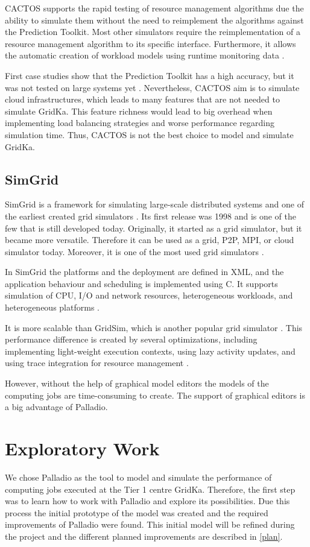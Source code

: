 CACTOS supports the rapid testing of resource management algorithms due the ability to simulate them without the need to reimplement the algorithms against the Prediction Toolkit. Most other simulators require the reimplementation of a resource management algorithm to its specific interface. Furthermore, it allows the automatic creation of workload models using runtime monitoring data \cite{rapidtesting}.

First case studies show that the Prediction Toolkit has a high accuracy, but it was not tested on large systems yet \cite{rapidtesting}. Nevertheless, CACTOS aim is to simulate cloud infrastructures, which leads to many features that are not needed to simulate GridKa. This feature richness would lead to big overhead when implementing load balancing strategies and worse performance regarding simulation time. Thus, CACTOS is not the best choice to model and simulate GridKa.


\section{SimGrid}
SimGrid is a framework for simulating large-scale distributed systems and one of the earliest created grid simulators \cite{simgrid_update}. Its first release was 1998 and is one of the few that is still developed today. Originally, it started as a grid simulator, but it became more versatile. Therefore it can be used as a grid, P2P, MPI, or cloud simulator today. Moreover, it is one of the most used grid simulators \cite{simgrid_update}.

In SimGrid the platforms and the deployment are defined in XML, and the application behaviour and scheduling is implemented using C. It supports simulation of CPU, I/O and network resources, heterogeneous workloads, and heterogeneous platforms \cite{simgrid_update}.

It is more scalable than GridSim, which is another popular grid simulator \cite{simgrid_update}.
This performance difference is created by several optimizations, including implementing light-weight execution contexts, using lazy activity updates, and using trace integration for resource management \cite{simgrid_update}.

However, without the help of graphical model editors the models of the computing jobs are time-consuming to create. The support of graphical editors is a big advantage of Palladio. 


\chapter{Exploratory Work}
We chose Palladio as the tool to model and simulate the performance of computing jobs executed at the Tier 1 centre GridKa. Therefore, the first step was to learn how to work with Palladio and explore its possibilities. Due this process the initial prototype of the model was created and the required improvements of Palladio were found. This initial model will be refined during the project and the different planned improvements are described in \cref{plan}.

